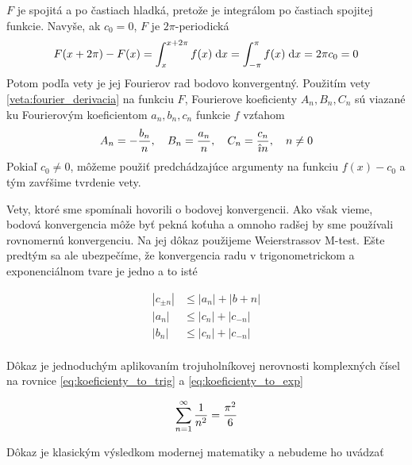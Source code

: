 \begin{dokaz}
    $F$ je spojitá a po častiach hladká, pretože je integrálom po
    častiach spojitej funkcie. Navyše, ak $c_0=0$, $F$ je
    $2\pi$-periodická 
    \begin{equation}
        F(x + 2\pi) -F(x) =\int_x^{x+2\pi} f(x) \; \mathrm{d} x =
            \int_{-\pi}^{\pi} f(x) \; \mathrm{d} x = 2 \pi c_0 = 0
    \end{equation}
    Potom podľa vety  je jej
    Fourierov rad bodovo konvergentný. Použitím vety
    \ref{veta:fourier_derivacia} na funkciu $F$, Fourierove
    koeficienty $A_n,B_n,C_n$ sú viazané ku Fourierovým koeficientom
    $a_n,b_n,c_n$ funkcie $f$ vzťahom
    \begin{equation}
        A_n = -\frac{b_n}{n}, \quad
        B_n = \frac{a_n}{n}, \quad
        C_n = \frac{c_n}{\hat{\imath} n}, \quad n\not=0
    \end{equation}
    Pokiaľ $c_0\not=0$, môžeme použiť predchádzajúce argumenty na
    funkciu $f(x)-c_0$ a tým zavŕšime tvrdenie vety.    
    \end{dokaz}


Vety, ktoré sme spomínali hovorili o bodovej konvergencii. Ako však
vieme, bodová konvergencia môže byť pekná koťuha a omnoho radšej by
sme používali rovnomernú konvergenciu. Na jej dôkaz použijeme
Weierstrassov M-test. Ešte predtým sa ale ubezpečíme, že
konvergencia radu v trigonometrickom a exponenciálnom tvare je jedno a
to isté
\begin{lema}
   \begin{align}
    |c_{\pm n}| &\le |a_n| + |b+n| \\
    |a_n| &\le |c_n| + |c_{-n}| \\
    |b_n| &\le |c_n| + |c_{-n}| \\    
   \end{align}
   \label{lema:konv_mtest_tring_exp_equiv}
\end{lema}
\begin{dokaz}
    Dôkaz je jednoduchým aplikovaním trojuholníkovej nerovnosti
    komplexných čísel na rovnice \ref{eq:koeficienty_to_trig}
    a \ref{eq:koeficienty_to_exp}
\end{dokaz}

\begin{lema}
    \begin{equation}
        \sum_{n=1}^{\infty} \frac{1}{n^2} = \frac{\pi^2}{6}
    \end{equation}
    \label{lema:sum_nn}
\end{lema}
\begin{dokaz}
    Dôkaz je klasickým výsledkom modernej matematiky a nebudeme ho
    uvádzať
\end{dokaz}

